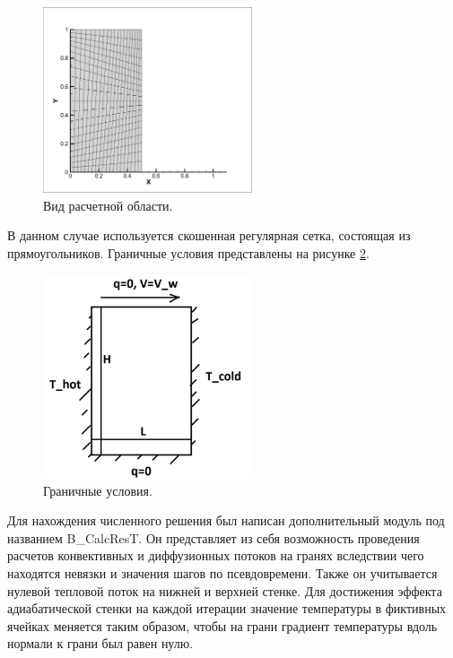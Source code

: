 \begin{figure}[H]
    \centering
    \includegraphics[width=0.55\textwidth]{img/32.png}
    \caption{Вид расчетной области.}
    \label{fig:32}
\end{figure}

В данном случае используется скошенная регулярная сетка, состоящая из прямоугольников. Граничные условия представлены на рисунке \ref{fig:33}.

\begin{figure}[H]
    \centering
    \includegraphics[width=0.55\textwidth]{img/33.png}
    \caption{Граничные условия.}
    \label{fig:33}
\end{figure}

Для нахождения численного решения был написан дополнительный модуль под названием B\_CalcResT. Он представляет из себя возможность проведения расчетов конвективных и диффузионных потоков на гранях вследствии чего находятся невязки и значения шагов по псевдовремени. Также он учитывается нулевой тепловой поток на нижней и верхней стенке. Для достижения эффекта адиабатической стенки на каждой итерации значение температуры в фиктивных ячейках меняется таким образом, чтобы на грани градиент температуры вдоль нормали к грани был равен нулю.

